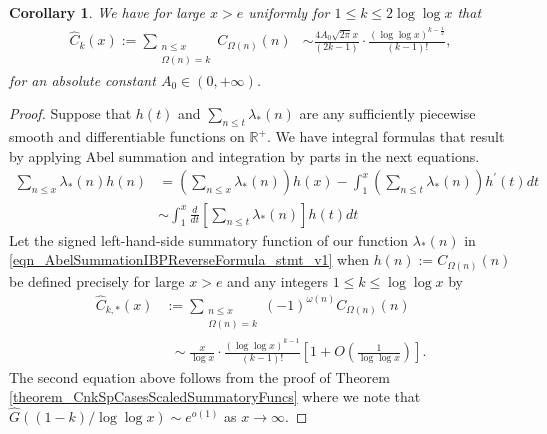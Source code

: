 \documentclass[11pt,reqno,a4letter]{article}
\numberwithin{figure}{section}
\numberwithin{table}{section}
\theoremstyle{plain}
\newtheorem{cor}[theorem]{Corollary}
\numberwithin{theorem}{section}
\theoremstyle{definition}
\begin{document}
\begin{cor} 
\label{cor_SummatoryFuncsOfUnsignedSeqs_v2} 
We have for large $x > e$ uniformly for $1 \leq k \leq 2\log\log x$ that  
\begin{align*} 
\widehat{C}_k(x) := 
     \sum_{\substack{n \leq x \\ \Omega(n) = k}} C_{\Omega(n)}(n) & \sim 
     \frac{4A_0\sqrt{2\pi} x}{(2k-1)} \cdot \frac{(\log\log x)^{k-\frac{1}{2}}}{(k-1)!}, 
\end{align*} 
for an absolute constant $A_0 \in (0, +\infty)$. 
\end{cor} 
\begin{proof} 
Suppose that $h(t)$ and $\sum_{n \leq t} \lambda_{\ast}(n)$ are any sufficiently 
piecewise smooth and differentiable functions on $\mathbb{R}^{+}$. 
We have integral formulas that result by 
applying Abel summation and integration by parts in the next equations. 
\begin{subequations}
\begin{align} 
\label{eqn_AbelSummationIBPReverseFormula_stmt_v1} 
     \sum_{n \leq x} \lambda_{\ast}(n) h(n) & = \left(\sum_{n \leq x} \lambda_{\ast}(n)\right) h(x) - 
     \int_{1}^{x} \left(\sum_{n \leq t} \lambda_{\ast}(n)\right) h^{\prime}(t) dt \\ 
\label{eqn_AbelSummationIBPReverseFormula_stmt_v2}
     & \sim 
     \int_1^{x} \frac{d}{dt}\left[\sum_{n \leq t} \lambda_{\ast}(n)\right] h(t) dt
\end{align} 
\end{subequations}
Let the signed left-hand-side summatory function of our function $\lambda_{\ast}(n)$ 
in \eqref{eqn_AbelSummationIBPReverseFormula_stmt_v1} when $h(n) := C_{\Omega(n)}(n)$ be defined precisely 
for large $x > e$ and any integers $1 \leq k \leq \log\log x$ by 
\begin{align*} 
\widehat{C}_{k,\ast}(x) & := \sum_{\substack{n \leq x \\ \Omega(n)=k}} 
     (-1)^{\omega(n)} C_{\Omega(n)}(n) \\ 
     & \phantom{:} \sim 
     \frac{x}{\log x} \cdot \frac{(\log\log x)^{k-1}}{(k-1)!} \left[ 
     1 + O\left(\frac{1}{\log\log x}\right)\right].
\end{align*} 
The second equation above follows from the proof of 
Theorem \ref{theorem_CnkSpCasesScaledSummatoryFuncs} where 
we note that $\widehat{G}((1-k)/\log\log x) \sim e^{o(1)}$ as 
$x \rightarrow \infty$. 


\end{proof}
\end{document}
